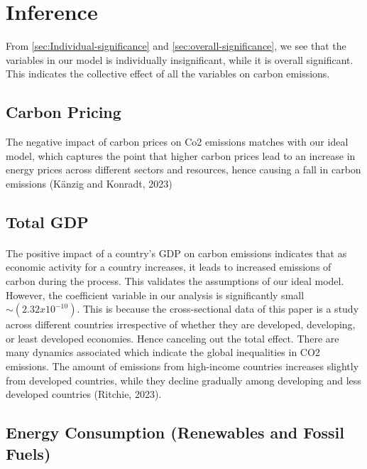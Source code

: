 \documentclass[12pt]{article}
\begin{document}
\section{Inference}
From \ref{sec:Individual-significance} and \ref{sec:overall-significance}, we see that the variables in our model is individually insignificant, while it is overall significant. This indicates the collective effect of all the variables on carbon emissions.



\subsection{Carbon Pricing}
The negative impact of carbon prices on Co2 emissions matches with our ideal model, which captures the point that higher carbon prices lead to an increase in energy prices across different sectors and resources, hence causing a fall in carbon emissions (Känzig and Konradt, 2023)


\subsection{Total GDP}
\paragraph{}
The positive impact of a country’s GDP on carbon emissions indicates that as economic activity for a country increases, it leads to increased emissions of carbon during the process. This validates the assumptions of our ideal model. However, the coefficient variable in our analysis is significantly small \(\sim{(2.32x10^{-10})}\). This is because the cross-sectional data of this paper is a study across different countries irrespective of whether they are developed, developing, or least developed economies. Hence canceling out the total effect. There are many dynamics associated which indicate the global inequalities in CO2 emissions. The amount of emissions from high-income countries increases slightly from developed countries, while they decline gradually among developing and less developed countries (Ritchie, 2023).


\subsection{Energy Consumption (Renewables and Fossil Fuels)}
\end{document}
